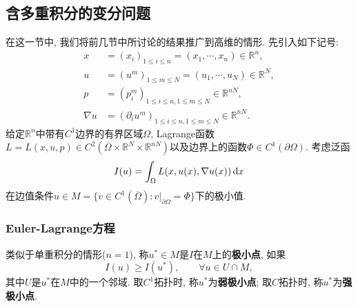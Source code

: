 \documentclass[12pt,a4paper]{article}
\begin{document}
\subsection{含多重积分的变分问题}

在这一节中, 我们将前几节中所讨论的结果推广到高维的情形. 先引入如下记号:
\begin{align*}
    x &= (x_i)_{1 \leq i \leq n} = (x_1, \cdots, x_n) \in \mathbb{R}^n, \\  
    u &= (u^m)_{1 \leq m \leq N} = (u_1, \cdots, u_N) \in \mathbb{R}^N, \\  
    p &= (p_i^m)_{1 \leq i \leq n, 1 \leq m \leq N} \in \mathbb{R}^{nN}, \\  
    \nabla u &= (\partial_iu^m)_{1 \leq i \leq n, 1 \leq m \leq N} \in \mathbb{R}^{nN}.
\end{align*}
给定$\mathbb{R}^n$中带有$C^1$边界的有界区域$\Omega$, Lagrange函数$L = L(x, u, p) \in C^2(\overline{\Omega} \times \mathbb{R}^N \times \mathbb{R}^{nN})$以及边界上的函数$\Phi \in C^1(\partial\Omega)$.
考虑泛函
\begin{equation*}
    I(u) = \int_{\Omega} L(x, u(x), \nabla u(x)) \,{\rm d}x
\end{equation*}
在边值条件$u \in M = \{v \in C^1(\overline{\Omega})\colon v|_{\partial\Omega} = \Phi\}$下的极小值.

\subsubsection{Euler-Lagrange方程}

类似于单重积分的情形($n = 1$), 称$u^* \in M$是$I$在$M$上的\textbf{极小点}, 如果 
\begin{equation*}
    I(u) \geq I(u^*), \qquad \forall u \in U \cap M,
\end{equation*}
其中$U$是$u^*$在$M$中的一个邻域. 取$C^1$拓扑时, 称$u^*$为\textbf{弱极小点}; 取$C$拓扑时, 称$u^*$为\textbf{强极小点}.
\end{document}
